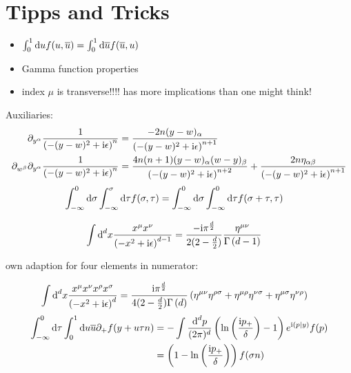 \ifdefined\mainprogram{}
\else

\fi

\section{Tipps and Tricks}
\begin{itemize}
	\item $\int _0^1 \text{d} u  f(u,\overline u) = \int _0^1 \text{d} \overline u  f(\overline u, u)$
	\item Gamma function properties
	\item index $\mu$ is transverse!!!! has more implications than one might think!
\end{itemize}


Auxiliaries: 
\begin{align}
	\partial_{y^\alpha} \frac{1}{ \left(-(y-w)^2+\text{i}\epsilon\right)^{n}}
	&=
	\frac{-2n(y-w)_\alpha}{ \left(-(y-w)^2+\text{i}\epsilon\right)^{n+1}}
	\\
	\partial_{w^\beta}\partial_{y^\alpha} \frac{1}{ \left(-(y-w)^2+\text{i}\epsilon\right)^{n}}
	&=
	\frac{4n(n+1)(y-w)_\alpha(w-y)_\beta}{ \left(-(y-w)^2+\text{i}\epsilon\right)^{n+2}}+\frac{2n\eta_{\alpha\beta}}{ \left(-(y-w)^2+\text{i}\epsilon\right)^{n+1}}
\end{align}
\begin{align}
	\int_{-\infty}^0 \text{d} \sigma \int _{-\infty}^\sigma \text{d} \tau f(\sigma, \tau)&=\int_{-\infty}^0 \text{d} \sigma \int _{-\infty}^0 \text{d} \tau f(\sigma + \tau, \tau) 
\end{align}

\begin{align}
	\int \text{d} ^d x \frac{x^\mu x^\nu}{\left(-x^2+\text{i} \epsilon\right)^{d-1}}
	&=
	\frac{-\text{i} \pi^{\frac{d}{2}}}{2(2-\frac{d}{2})}\frac{\eta^{\mu\nu}}{\Gamma\left(d-1\right)}
\end{align}

own adaption for four elements in numerator:

\begin{align}
	\int \text{d} ^d  x \frac{x^\mu x^\nu x^\rho x^\sigma}{\left(-x^2+\text{i} \epsilon\right)^{d}}
	&=
	\frac{\text{i} \pi^{\frac{d}{2}}}{4(2-\frac{d}{2})\Gamma\left(d\right)}\left(\eta^{\mu\nu}\eta^{\rho \sigma} + \eta^{\mu \rho} \eta^{\nu \sigma} +\eta^{\mu \sigma}\eta^{\nu \rho}\right)	
\end{align}
\begin{align}
\int_{-\infty}^{0} \text{d} \tau \int_0^1 \text{d} u \overline u \partial_+f(y+  u \tau n)
&=
-\int \frac{\text{d} ^d p}{(2\pi)^d}\left( \ln\left(\frac{\text{i} p_{+}}{\delta}\right) -1\right) e^{\text{i} (p|y)}f(p)
\\
&=
\left(1-\ln\left(\frac{\text{i} p_{+}}{\delta}\right)\right)f(\sigma n)
\end{align}
\ifdefined\mainprogram{}
\else

\fi